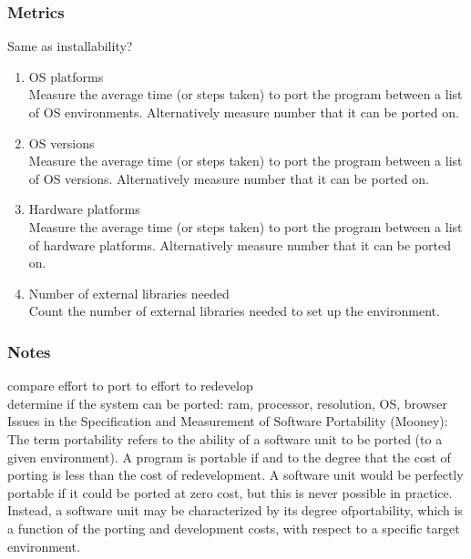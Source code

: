 \documentclass{article}
\begin{document}
\subsubsection{Metrics}
Same as installability?
\begin{enumerate}
	\item OS platforms\\
	
	Measure the average time (or steps taken) to port the program between a list of OS environments. Alternatively measure number that it can be ported on.
	
	\item OS versions\\
	
	Measure the average time (or steps taken) to port the program between a list of OS versions. Alternatively measure number that it can be ported on.
	
	\item Hardware platforms\\
	
	Measure the average time (or steps taken) to port the program between a list of hardware platforms. Alternatively measure number that it can be ported on.
	
	\item Number of external libraries needed\\
	
	Count the number of external libraries needed to set up the environment.
	
\end{enumerate}

\subsubsection{Notes}
compare effort to port to effort to redevelop\\ 

determine if the system can be ported: ram, processor, resolution, OS, browser\\ 

\noindent Issues in the Specification and Measurement of Software Portability (Mooney):\\
The term portability
 refers to the ability of a software
 unit to be ported (to a given environment).
 A program is
 portable if and to the degree that the cost of porting is less than
 the cost of redevelopment. A software unit would be perfectly
 portable if it could be ported at zero cost, but this is never
 possible in practice.
 Instead, a software unit may be
 characterized by its degree ofportability,
 which is a function of
 the porting and development costs, with respect to a specific
 target environment.\\   
 
\end{document}
